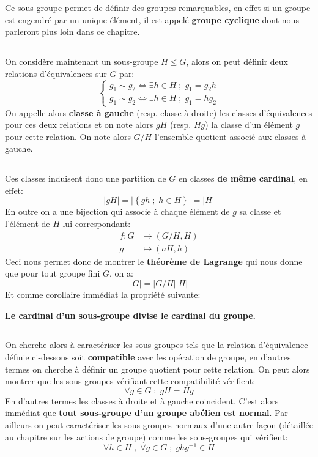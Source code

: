 Ce sous-groupe permet de définir des groupes remarquables, en effet si un groupe est engendré par un unique élément, il est appelé \textbf{groupe cyclique} dont nous parleront plus loin dans ce chapitre.
\pagebreak
\subsection*{}
On considère maintenant un sous-groupe \( H \leq G \), alors on peut définir deux relations d'équivalences sur \( G \) par:
\[ 
   \begin{cases}
      g_1 \sim g_2 \iff \exists h \in H \; ; \; g_1 = g_2h\\
      g_1 \sim g_2 \iff \exists h \in H \; ; \; g_1 = hg_2
   \end{cases}
\] 
On appelle alors \textbf{classe à gauche} (resp. classe à droite) les classes d'équivalences pour ces deux relations et on note alors \( gH \) (resp. \( Hg \)) la classe d'un élément \( g \) pour cette relation. On note alors \( G/H \) l'ensemble quotient associé aux classes à gauche.
\subsection*{}
Ces classes induisent donc une partition de \( G \) en classes \textbf{de même cardinal}, en effet:
\[ 
   |gH| = \left|\left\{ gh \; ; \; h \in H \right\} \right| = |H|
\]
En outre on a une bijection qui associe à chaque élément de \( g \) sa classe et l'élément de \( H \) lui correspondant:
\[ 
   \begin{aligned}
      f : G &\longrightarrow (G/H, H)\\
      g &\longmapsto (aH, h)
   \end{aligned}
\]
Ceci nous permet donc de montrer le \textbf{théorème de Lagrange} qui nous donne que pour tout groupe fini \( G \), on a:
\[ 
   |G| = |G/H||H|
\]
Et comme corollaire immédiat la propriété suivante:
\begin{center}
   \textbf{Le cardinal d'un sous-groupe divise le cardinal du groupe.}
\end{center}
\subsection*{}
On cherche alors à caractériser les sous-groupes tels que la relation d'équivalence définie ci-dessous soit \textbf{compatible} avec les opération de groupe, en d'autres termes on cherche à définir un groupe quotient pour cette relation. On peut alors montrer que les sous-groupes vérifiant cette compatibilité vérifient:
\[ 
   \forall g \in G \; ; \; gH = Hg 
\]
En d'autres termes les classes à droite et à gauche coincident. C'est alors immédiat que \textbf{tout sous-groupe d'un groupe abélien est normal}. Par ailleurs on peut caractériser les sous-groupes normaux d'une autre façon (détaillée au chapitre sur les actions de groupe) comme les sous-groupes qui vérifient:
\[ 
   \forall h \in H \; , \; \forall g \in G \; ; \; ghg^{-1} \in H 
\]
